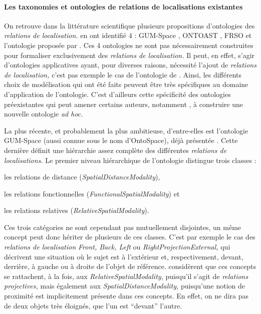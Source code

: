 \paragraph{Les taxonomies et ontologies de relations de localisations
  existantes}

On retrouve dans la littérature scientifique plusieurs propositions
d'ontologies des \emph{relations de localisation.}
\textcite{Duchene2019} en ont identifié 4 : GUM-Space
\autocite{Bateman2010}, ONTOAST \autocite{Miron2007}, FRSO
\autocite{Hudelot2008a} et l'ontologie proposée par
\textcite{Dasiopoulou2005}. Ces 4 ontologies ne sont pas
nécessairement construites pour formaliser exclusivement des
\emph{relations de localisation.} Il peut, en effet, s'agir
d'ontologies applicatives ayant, pour diverses raisons, nécessité
l'ajout de \emph{relations de localisation,} c'est pas exemple le cas
de l'ontologie de \textcite{Dasiopoulou2005}. Ainsi, les différents
choix de modélisation qui ont été faits peuvent être très spécifiques
au domaine d’application de l'ontologie. C'est d'ailleurs cette
spécificité des ontologies préexistantes qui peut amener certains
auteurs, notamment \textcite{Hudelot2008a}, à construire une nouvelle
ontologie \emph{ad hoc.}

La plus récente, et probablement la plus ambitieuse, d'entre-elles est
l'ontologie GUM-Space (aussi connue sous le nom d'OntoSpace), déjà
présentée \autocite{Bateman2010}.  Cette dernière définit une
hiérarchie assez complète des différentes \emph{relations de
  localisations.} Le premier niveau hiérarchique de l'ontologie
distingue trois classes :
% 
\begin{enumerate*}
\item les relations de distance (\emph{SpatialDistanceModality}),
\item les relations fonctionnelles
  (\emph{FunctionalSpatialModality}) et
\item les relations relatives (\emph{RelativeSpatialModality}).
\end{enumerate*}
% 
Ces trois catégories ne sont cependant pas mutuellement disjointes, un
même concept peut donc hériter de plusieurs de ces classes. C'est par
exemple le cas des \emph{relations de localisation} \emph{Front, Back,
  Left} ou \emph{RightProjectionExternal,} qui décrivent une situation
où le sujet est à l'extérieur et, respectivement, devant, derrière, à
gauche ou à droite de l'objet de référence. \textcite{Bateman2010}
considèrent que ces concepts se rattachent, à la fois, aux
\emph{RelativeSpatialModality,} puisqu'il s'agit de \emph{relations
  projectives,} mais également aux \emph{SpatialDistanceModality,}
puisqu'une notion de proximité est implicitement présente dans ces
concepts. En effet, on ne dira pas de deux objets très éloignés, que
l'un est \enquote{devant} l'autre.

